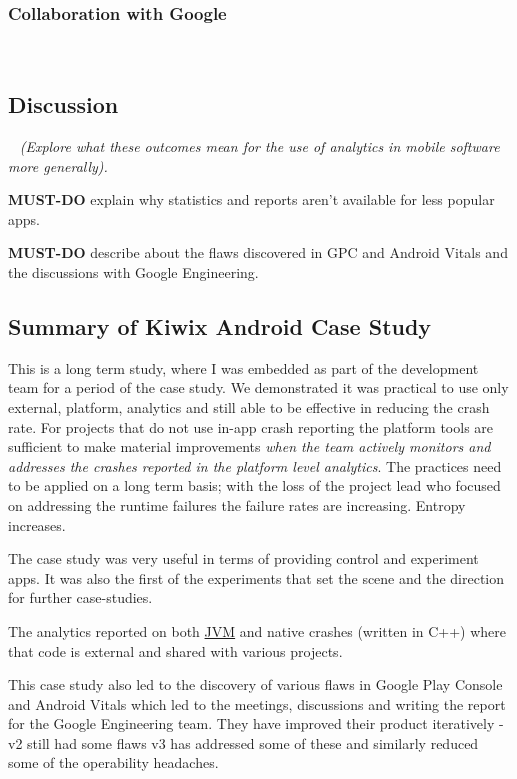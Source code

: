 \subsubsection{Collaboration with Google}~\label{section-collaboration-with-google}




\subsection{Discussion}~\label{case-study-kiwix-discussion}
\textit{(Explore what these outcomes mean for the use of analytics in mobile software more generally).}

\textbf{MUST-DO} explain why statistics and reports aren't available for less popular apps.

\textbf{MUST-DO} describe about the flaws discovered in GPC and Android Vitals and the discussions with Google Engineering.



\subsection{Summary of Kiwix Android Case Study}

This is a long term study, where I was embedded as part of the development team for a period of the case study. We demonstrated it was practical to use only external, platform, analytics and still able to be effective in reducing the crash rate. For projects that do not use in-app crash reporting the platform tools are sufficient to make material improvements \emph{when the team actively monitors and addresses the crashes reported in the platform level analytics}. The practices need to be applied on a long term basis; with the loss of the project lead who focused on addressing the runtime failures the failure rates are increasing. Entropy increases.

The case study was very useful in terms of providing  control and experiment apps. It was also the first of the experiments that set the scene and the direction for further case-studies.

The analytics reported on both \href{glossary_jvm}{JVM} and native crashes (written in C++) where that code is external and shared with various projects. 

This case study also led to the discovery of various flaws in Google Play Console and Android Vitals which led to the meetings, discussions and writing the report for the Google Engineering team. They have improved their product iteratively - v2 still had some flaws v3 has addressed some of these and similarly reduced some of the operability headaches.




